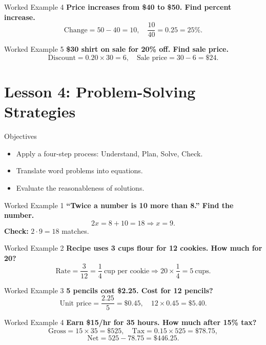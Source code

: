 \documentclass[aspectratio=169]{beamer}
\begin{document}
\begin{frame}{Worked Example 4}
\textbf{Price increases from \$40 to \$50. Find percent increase.}
\[
\text{Change} = 50-40=10,\quad \frac{10}{40}=0.25=25\%.
\]
\end{frame}

\begin{frame}{Worked Example 5}
\textbf{\$30 shirt on sale for 20\% off. Find sale price.}
\[
\text{Discount} = 0.20\times 30 = 6,\quad \text{Sale price}=30-6=\$24.
\]
\end{frame}

\section{Lesson 4: Problem-Solving Strategies}

\begin{frame}{Objectives}
\begin{itemize}
  \item Apply a four-step process: Understand, Plan, Solve, Check.
  \item Translate word problems into equations.
  \item Evaluate the reasonableness of solutions.
\end{itemize}
\end{frame}

\begin{frame}{Worked Example 1}
\textbf{``Twice a number is 10 more than 8.'' Find the number.}
\[
2x = 8 + 10 = 18 \Rightarrow x=9.
\]
\textbf{Check: } \(2\cdot 9=18\) matches.
\end{frame}

\begin{frame}{Worked Example 2}
\textbf{Recipe uses 3 cups flour for 12 cookies. How much for 20?}
\[
\text{Rate} = \frac{3}{12}=\frac{1}{4}\ \text{cup per cookie} \Rightarrow 20\times \frac{1}{4} = 5\ \text{cups}.
\]
\end{frame}

\begin{frame}{Worked Example 3}
\textbf{5 pencils cost \$2.25. Cost for 12 pencils?}
\[
\text{Unit price} = \frac{2.25}{5} = \$0.45,\quad 12\times 0.45 = \$5.40.
\]
\end{frame}

\begin{frame}{Worked Example 4}
\textbf{Earn \$15/hr for 35 hours. How much after 15\% tax?}
\[
\text{Gross} = 15\times 35 = \$525,\quad \text{Tax} = 0.15\times 525 = \$78.75,
\]
\[
\text{Net} = 525 - 78.75 = \$446.25.
\]
\end{frame}
\end{document}
